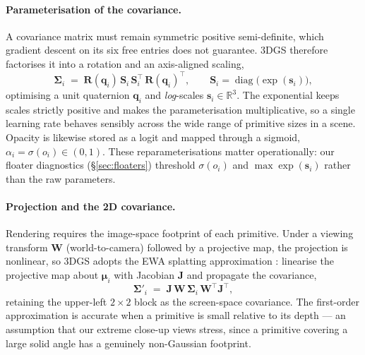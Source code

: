 \paragraph{Parameterisation of the covariance.}
A covariance matrix must remain symmetric positive semi-definite, which gradient
descent on its six free entries does not guarantee. 3DGS therefore factorises it
into a rotation and an axis-aligned scaling,
\begin{equation}
  \bm{\Sigma}_i \;=\; \bm{R}(\bm{q}_i)\,\bm{S}_i\,\bm{S}_i^{\!\top}\,\bm{R}(\bm{q}_i)^{\!\top},
  \qquad
  \bm{S}_i=\operatorname{diag}\!\big(\exp(\bm{s}_i)\big),
  \label{eq:covariance}
\end{equation}
optimising a unit quaternion $\bm{q}_i$ and \emph{log}-scales
$\bm{s}_i\in\mathbb{R}^3$. The exponential keeps scales strictly positive and makes
the parameterisation multiplicative, so a single learning rate behaves sensibly
across the wide range of primitive sizes in a scene. Opacity is likewise stored as
a logit and mapped through a sigmoid, $\alpha_i=\sigma(o_i)\in(0,1)$. These
reparameterisations matter operationally: our floater diagnostics
(\S\ref{sec:floaters}) threshold $\sigma(o_i)$ and $\max\exp(\bm{s}_i)$ rather
than the raw parameters.

\paragraph{Projection and the 2D covariance.}
Rendering requires the image-space footprint of each primitive. Under a viewing
transform $\bm{W}$ (world-to-camera) followed by a projective map, the projection
is nonlinear, so 3DGS adopts the EWA splatting approximation
\cite{zwicker2001ewa,zwicker2001surface}: linearise the projective map about
$\bm{\mu}_i$ with Jacobian $\bm{J}$ and propagate the covariance,
\begin{equation}
  \bm{\Sigma}'_i \;=\; \bm{J}\,\bm{W}\,\bm{\Sigma}_i\,\bm{W}^{\!\top}\bm{J}^{\!\top},
  \label{eq:proj}
\end{equation}
retaining the upper-left $2\times2$ block as the screen-space covariance. The
first-order approximation is accurate when a primitive is small relative to its
depth --- an assumption that our extreme close-up views stress, since a primitive
covering a large solid angle has a genuinely non-Gaussian footprint.

